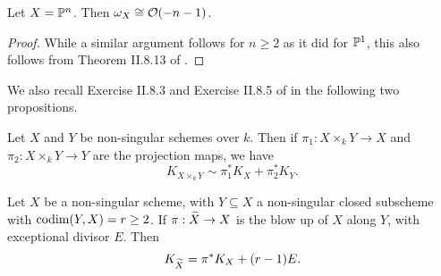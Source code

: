 \begin{proposition}
    Let $X = \mathbb{P}^n$.
    Then $\omega_X \cong \mathcal{O}(-n - 1)$.
\end{proposition}

\begin{proof}
    While a similar argument follows for $n \geq 2$ as it did for $\mathbb{P}^1$,
    this also follows from Theorem II.8.13 of \cite{Hartshorne_2013}.
\end{proof}

We also recall Exercise II.8.3 and Exercise II.8.5 of \cite{Hartshorne_2013} in the following two propositions.

\begin{proposition}
    Let $X$ and $Y$ be non-singular schemes over $k$.
    Then if $\pi_1 : X \times_k Y \to X$ and $\pi_2 : X \times_k Y \to Y$ are the projection maps,
    we have
    \[
        K_{X \times_k Y}
        \sim \pi_1^* K_X + \pi_2^* K_Y.
    \]
\end{proposition}

\begin{proposition}
    Let $X$ be a non-singular scheme,
    with $Y \subseteq X$ a non-singular closed subscheme with ${\rm codim}(Y, X) = r \geq 2$.
    If $\pi : \widetilde X \to X$ is the blow up of $X$ along $Y$,
    with exceptional divisor $E$.
    Then
    \[
        K_{\widetilde X} = \pi^* K_X + (r - 1)E.
    \]
\end{proposition}